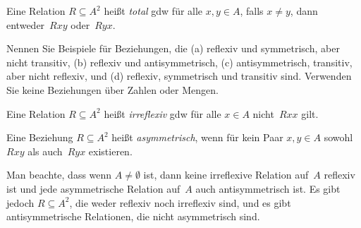 \documentclass[../../../include/open-logic-section]{subfiles}
\begin{document}
\begin{defn}[Totalität]
Eine Relation $R \subseteq A^2$ heißt \emph{total} gdw für alle $x,y\in
A$, falls $x \neq y$, dann entweder~$Rxy$ oder~$Ryx$.
\end{defn}

\begin{prob}
Nennen Sie Beispiele für Beziehungen, die (a) reflexiv und symmetrisch, aber
nicht transitiv, (b) reflexiv und antisymmetrisch, (c) antisymmetrisch,
transitiv, aber nicht reflexiv, und (d) reflexiv, symmetrisch und
transitiv sind.  Verwenden Sie keine Beziehungen über Zahlen oder Mengen.
\end{prob} 
 
\begin{defn}[Irreflexivität]
Eine Relation $R \subseteq A^2$ heißt \emph{irreflexiv} gdw für alle $x \in
A$ nicht~$Rxx$ gilt. 
\end{defn}

\begin{defn}[Asymmetrie]
Eine Beziehung $R \subseteq A^2$ heißt \emph{asymmetrisch}, wenn für kein Paar $x,y\in
A$ sowohl $Rxy$ als auch~$Ryx$ existieren. 
\end{defn}

Man beachte, dass wenn $A \neq \emptyset$ ist, dann keine irreflexive Relation auf~$A$
reflexiv ist und jede asymmetrische Relation auf~$A$ auch
antisymmetrisch ist. Es gibt jedoch $R \subseteq A^2$, die weder
reflexiv noch irreflexiv sind, und es gibt antisymmetrische
Relationen, die nicht asymmetrisch sind. 
\end{document}
